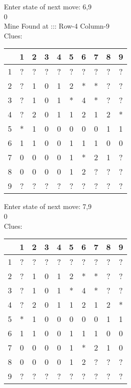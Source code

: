 Enter state of next move: 6,9\\
0\\
Mine Found at ::: Row-4 Column-9\\
Clues:\\
\begin{tabular}{|c|c|c|c|c|c|c|c|c|c|}
\hline
  & 1 & 2 & 3 & 4 & 5 & 6 & 7 & 8 & 9\\
\hline
1 & ? & ? & ? & ? & ? & ? & ? & ? & ?\\
\hline
2 & ? & 1 & 0 & 1 & 2 & * & * & ? & ?\\
\hline
3 & ? & 1 & 0 & 1 & * & 4 & * & ? & ?\\
\hline
4 & ? & 2 & 0 & 1 & 1 & 2 & 1 & 2 & *\\
\hline
5 & * & 1 & 0 & 0 & 0 & 0 & 0 & 1 & 1\\
\hline
6 & 1 & 1 & 0 & 0 & 1 & 1 & 1 & 0 & 0\\
\hline
7 & 0 & 0 & 0 & 0 & 1 & * & 2 & 1 & ?\\
\hline
8 & 0 & 0 & 0 & 0 & 1 & 2 & ? & ? & ?\\
\hline
9 & ? & ? & ? & ? & ? & ? & ? & ? & ?\\
\hline
\end{tabular}

Enter state of next move: 7,9\\
0\\
Clues:\\
\begin{tabular}{|c|c|c|c|c|c|c|c|c|c|}
\hline
  & 1 & 2 & 3 & 4 & 5 & 6 & 7 & 8 & 9\\
\hline
1 & ? & ? & ? & ? & ? & ? & ? & ? & ?\\
\hline
2 & ? & 1 & 0 & 1 & 2 & * & * & ? & ?\\
\hline
3 & ? & 1 & 0 & 1 & * & 4 & * & ? & ?\\
\hline
4 & ? & 2 & 0 & 1 & 1 & 2 & 1 & 2 & *\\
\hline
5 & * & 1 & 0 & 0 & 0 & 0 & 0 & 1 & 1\\
\hline
6 & 1 & 1 & 0 & 0 & 1 & 1 & 1 & 0 & 0\\
\hline
7 & 0 & 0 & 0 & 0 & 1 & * & 2 & 1 & 0\\
\hline
8 & 0 & 0 & 0 & 0 & 1 & 2 & ? & ? & ?\\
\hline
9 & ? & ? & ? & ? & ? & ? & ? & ? & ?\\
\hline
\end{tabular}

